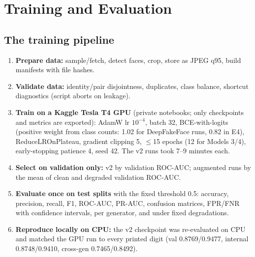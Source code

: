 \documentclass[11pt,a4paper]{report}
\begin{document}
\chapter{Training and Evaluation}

\section{The training pipeline}
\begin{enumerate}
\item \textbf{Prepare data:} sample/fetch, detect faces, crop, store as JPEG q95, build manifests with file hashes.
\item \textbf{Validate data:} identity/pair disjointness, duplicates, class balance, shortcut diagnostics (script aborts on leakage).
\item \textbf{Train on a Kaggle Tesla T4 GPU} (private notebooks; only checkpoints and metrics are exported): AdamW lr $10^{-4}$, batch 32, BCE-with-logits (positive weight from class counts: 1.02 for DeepFakeFace runs, 0.82 in E4), ReduceLROnPlateau, gradient clipping 5, $\le$15 epochs (12 for Models 3/4), early-stopping patience 4, seed 42. The v2 runs took 7--9 minutes each.
\item \textbf{Select on validation only:} v2 by validation ROC-AUC; augmented runs by the mean of clean and degraded validation ROC-AUC.
\item \textbf{Evaluate once on test splits} with the fixed threshold 0.5: accuracy, precision, recall, F1, ROC-AUC, PR-AUC, confusion matrices, FPR/FNR with confidence intervals, per generator, and under fixed degradations.
\item \textbf{Reproduce locally on CPU:} the v2 checkpoint was re-evaluated on CPU and matched the GPU run to every printed digit (val 0.8769/0.9477, internal 0.8748/0.9410, cross-gen 0.7465/0.8492).
\end{enumerate}
\end{document}
